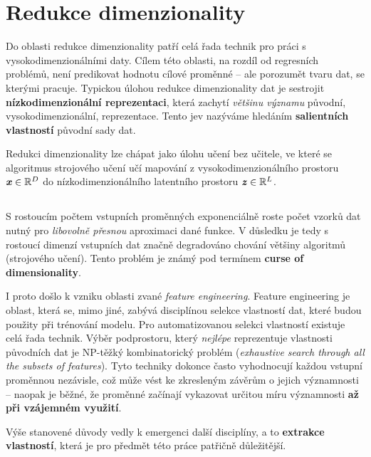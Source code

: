 \section{Redukce dimenzionality}
\label{sec:dimensionality_reduction}

Do oblasti redukce dimenzionality patří celá řada technik pro práci s vysokodimenzionálními daty.
Cílem této oblasti, na rozdíl od regresních problémů, není predikovat hodnotu cílové proměnné – ale porozumět tvaru dat, se kterými pracuje.
Typickou úlohou redukce dimenzionality dat je sestrojit \textbf{nízkodimenzionální reprezentaci}, která zachytí \emph{většinu významu} původní, vysokodimenzionální, reprezentace.
Tento jev nazýváme hledáním \textbf{salientních vlastností} původní sady dat. \cite{Phillips2021}

Redukci dimenzionality lze chápat jako úlohu učení bez učitele, ve které se algoritmus strojového učení učí mapování z vysokodimenzionálního prostoru $\textbf{\emph{x}} \in \mathbb{R}^D$ do nízkodimenzionálního latentního prostoru $\textbf{\emph{z}} \in \mathbb{R}^L$. \cite{Murphy2022}

\subsection{}
S rostoucím počtem vstupních proměnných exponenciálně roste počet vzorků dat nutný pro \emph{libovolně přesnou} aproximaci dané funkce.
V důsledku je tedy s rostoucí dimenzí vstupních dat značně degradováno chování většiny algoritmů (strojového učení).
Tento problém je známý pod termínem \textbf{curse of dimensionality}. \cite{Bellman1957}

I proto došlo k vzniku oblasti zvané \emph{feature engineering}.
Feature engineering je oblast, která se, mimo jiné, zabývá disciplínou selekce vlastností dat, které budou použity při trénování modelu.
Pro automatizovanou selekci vlastností existuje celá řada technik.
Výběr podprostoru, který \emph{nejlépe} reprezentuje vlastnosti původních dat je NP-těžký kombinatorický problém (\emph{exhaustive search through all the subsets of features}).
Tyto techniky dokonce často vyhodnocují každou vstupní proměnnou nezávisle, což může vést ke zkresleným závěrům o jejich významnosti – naopak je běžné, že proměnné začínají vykazovat určitou míru významnosti \textbf{až při vzájemném využití}. \cite{Stanczyk2015}

Výše stanovené důvody vedly k emergenci další disciplíny, a to \textbf{extrakce vlastností}, která je pro předmět této práce patřičně důležitější.

